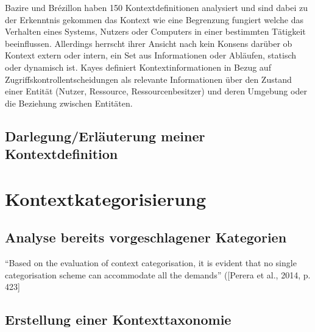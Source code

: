 Bazire und Brézillon \cite{hutchison_understanding_2005} haben 150 Kontextdefinitionen analysiert und sind dabei zu der Erkenntnis gekommen das Kontext wie eine Begrenzung fungiert welche das Verhalten eines Systems, Nutzers oder Computers in einer bestimmten Tätigkeit beeinflussen. Allerdings herrscht ihrer Ansicht nach kein Konsens darüber ob Kontext extern oder intern, ein Set aus Informationen oder Abläufen, statisch oder dynamisch ist.
Kayes \cite{kayes_icaf_2012} definiert Kontextinformationen in Bezug auf Zugriffskontrollentscheidungen als relevante Informationen über den Zustand einer Entität (Nutzer, Ressource, Ressourcenbesitzer) und deren Umgebung oder die Beziehung zwischen Entitäten.

\subsection{Darlegung/Erläuterung meiner Kontextdefinition}

\section{Kontextkategorisierung}
\subsection{ Analyse bereits vorgeschlagener Kategorien} 


“Based on the evaluation of context categorisation, it is evident that no single categorisation scheme can accommodate all the demands” ([Perera et al., 2014, p. 423]
\subsection{ Erstellung einer Kontexttaxonomie }

